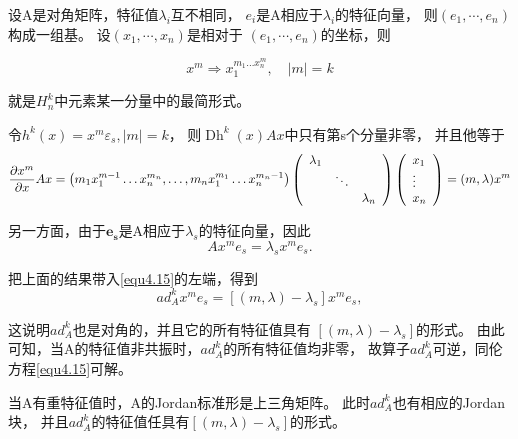 设A是对角矩阵，特征值\(\lambda_i\)互不相同，
\(e_i\)是A相应于\(\lambda_i\)的特征向量，
则$\left( e _ { 1 } , \cdots , e _ { n } \right)$构成一组基。
设$\left( x _ { 1 } , \cdots , x _ { n } \right)$是相对于
$\left( e _ { 1 } , \cdots , e _ { n } \right)$的坐标，则

\begin{equation}
x ^ { m } \Longrightarrow x _ { 1 } ^ { m _ { 1 } \ldots x _ { n } ^ { m } } , \quad | m | = k
\end{equation}

就是\(H_n^k\)中元素某一分量中的最简形式。

令$h ^ { k } ( x ) = x ^ { m } \varepsilon _ { s } , | m | = k$，
则$\operatorname { Dh } ^ { k } ( x ) A x$中只有第s个分量非零，
并且他等于
\[
  \frac { \partial x ^ { m } } { \partial x } A x
  =\left( m _ { 1 } x _ { 1 } ^ { m - 1 } \dots x _ { n } ^ { m_n } , \dots , m _ { n } x _ { 1 } ^ { m_1 } \dots x _ { n } ^ { m_n - 1 } \right)
  \left(
    \begin{array} { c c c }
      { \lambda _ { 1 } } & { } & { } \\
      { } & { \ddots } & { } \\
      { } & { } & { \lambda _ { n } }
    \end{array}
  \right)
  \left(
    \begin{array} { l }
      { x _ { 1 } } \\
      { \vdots } \\
      { x _ { n } }
    \end{array}
  \right)
  =( m , \lambda ) x ^ { m }
\]

另一方面，由于$\boldsymbol { e } _ { \mathbf { s } }$是A相应于\(\lambda_s\)的特征向量，因此
\[
A x ^ { m } e _ { s } = \lambda _ { s } x ^ { m } e _ { s }.
\]

把上面的结果带入\ref{equ4.15}的左端，得到
\begin{equation}
    \label{eq:1.4.17}
a d _ { A } ^ { k } x ^ { m } e _ { s } = \left[ ( m , \lambda ) - \lambda _ { s } \right] x ^ { m } e _ { s },
\end{equation}

这说明\(ad_A^k\)也是对角的，并且它的所有特征值具有
$\left[ ( m , \lambda ) - \lambda _ { s } \right]$的形式。
由此可知，当A的特征值非共振时，\(ad_A^k\)的所有特征值均非零，
故算子\(ad_A^k\)可逆，同伦方程\ref{equ4.15}可解。

当A有重特征值时，A的Jordan标准形是上三角矩阵。
此时\(ad_A^k\)也有相应的Jordan块，
并且\(ad_A^k\)的特征值任具有$\left[ ( m , \lambda ) - \lambda _ { s } \right]$的形式。

